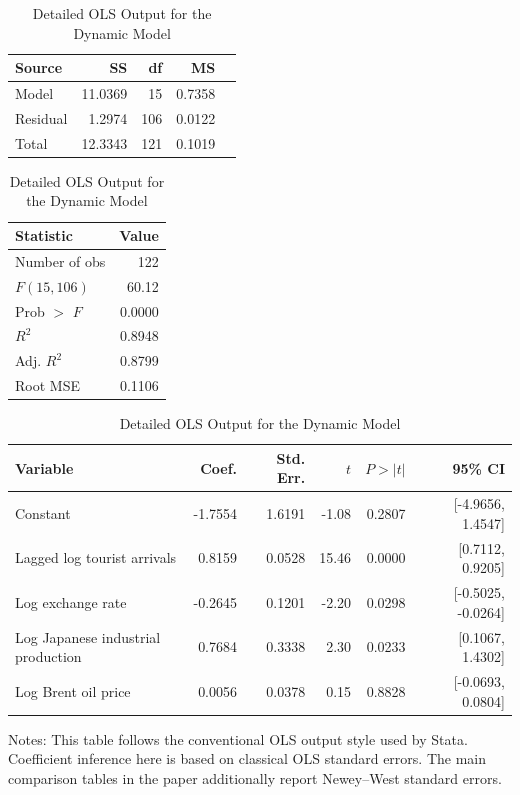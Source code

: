 \begin{table}[H]
\centering
\caption{Detailed OLS Output for the Dynamic Model}
\label{tab:statadyn}
\begin{minipage}{0.48\textwidth}
\centering
\begin{tabular}{lrrrr}
\toprule
Source & SS & df & MS & \\
\midrule
Model & 11.0369 & 15 & 0.7358 & \\
Residual & 1.2974 & 106 & 0.0122 & \\
Total & 12.3343 & 121 & 0.1019 & \\
\bottomrule
\end{tabular}
\end{minipage}
\hfill
\begin{minipage}{0.44\textwidth}
\centering
\begin{tabular}{lr}
\toprule
Statistic & Value \\
\midrule
Number of obs & 122 \\
$F(15,106)$ & 60.12 \\
Prob $>$ $F$ & 0.0000 \\
$R^2$ & 0.8948 \\
Adj. $R^2$ & 0.8799 \\
Root MSE & 0.1106 \\
\bottomrule
\end{tabular}
\end{minipage}
\vspace{0.8em}
\begin{tabular}{lrrrrr}
\toprule
Variable & Coef. & Std. Err. & $t$ & $P>|t|$ & 95\% CI \\
\midrule
Constant & -1.7554 & 1.6191 & -1.08 & 0.2807 & [-4.9656, 1.4547] \\
Lagged log tourist arrivals & 0.8159 & 0.0528 & 15.46 & 0.0000 & [0.7112, 0.9205] \\
Log exchange rate & -0.2645 & 0.1201 & -2.20 & 0.0298 & [-0.5025, -0.0264] \\
Log Japanese industrial production & 0.7684 & 0.3338 & 2.30 & 0.0233 & [0.1067, 1.4302] \\
Log Brent oil price & 0.0056 & 0.0378 & 0.15 & 0.8828 & [-0.0693, 0.0804] \\
\bottomrule
\end{tabular}
\begin{minipage}{0.95\textwidth}
\vspace{0.4em}\footnotesize Notes: This table follows the conventional OLS output style used by Stata. Coefficient inference here is based on classical OLS standard errors. The main comparison tables in the paper additionally report Newey--West standard errors.
\end{minipage}
\end{table}
